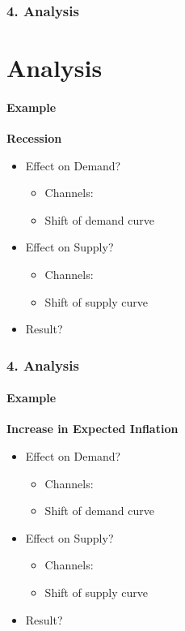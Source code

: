 \documentclass{beamer}
\begin{document}
\begin{frame}[t]
    \frametitle{4. Analysis}
    \section{Analysis}
    \framesubtitle{Example}

    \textbf{Recession}
    \begin{itemize}
        \item Effect on Demand?
            \begin{itemize}
                \item Channels:
                \item Shift of demand curve
            \end{itemize}
        \item Effect on Supply?
                    \begin{itemize}
                \item Channels:
                \item Shift of supply curve
            \end{itemize}
        \item Result?
    \end{itemize}

\end{frame}

\begin{frame}[t]
    \frametitle{4. Analysis}
    \framesubtitle{Example}

    \textbf{Increase in Expected Inflation}
    \begin{itemize}
        \item Effect on Demand?
            \begin{itemize}
                \item Channels:
                \item Shift of demand curve
            \end{itemize}
        \item Effect on Supply?
                    \begin{itemize}
                \item Channels:
                \item Shift of supply curve
            \end{itemize}
        \item Result?
    \end{itemize}

\end{frame}
\end{document}
